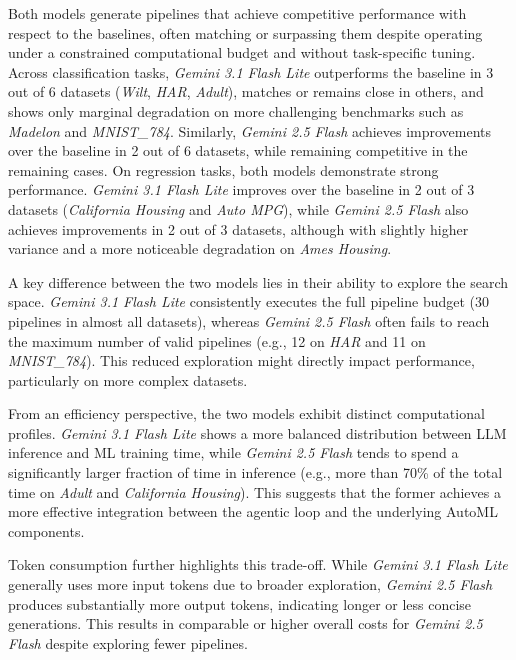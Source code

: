 \documentclass[runningheads]{llncs}
\begin{document}
Both models generate pipelines that achieve competitive performance with respect to the baselines,
often matching or surpassing them despite operating under a constrained computational budget and without task-specific tuning.
%
Across classification tasks,
\textit{Gemini 3.1 Flash Lite} outperforms the baseline in 3 out of 6 datasets (\textit{Wilt}, \textit{HAR}, \textit{Adult}),
matches or remains close in others,
and shows only marginal degradation on more challenging benchmarks such as \textit{Madelon} and \textit{MNIST\_784}.
%
Similarly,
\textit{Gemini 2.5 Flash} achieves improvements over the baseline in 2 out of 6 datasets,
while remaining competitive in the remaining cases.
%
On regression tasks, both models demonstrate strong performance.
\textit{Gemini 3.1 Flash Lite} improves over the baseline in 2 out of 3 datasets (\textit{California Housing} and \textit{Auto MPG}),
while \textit{Gemini 2.5 Flash} also achieves improvements in 2 out of 3 datasets,
although with slightly higher variance and a more noticeable degradation on \textit{Ames Housing}.

A key difference between the two models lies in their ability to explore the search space.
%
\textit{Gemini 3.1 Flash Lite} consistently executes the full pipeline budget
(30 pipelines in almost all datasets),
whereas \textit{Gemini 2.5 Flash} often fails to reach the maximum number of valid pipelines
(e.g., 12 on \textit{HAR} and 11 on \textit{MNIST\_784}).
%
This reduced exploration might directly impact performance,
particularly on more complex datasets.

From an efficiency perspective,
the two models exhibit distinct computational profiles.
%
\textit{Gemini 3.1 Flash Lite} shows a more balanced distribution between \ac{LLM} inference and ML training time,
while \textit{Gemini 2.5 Flash} tends to spend a significantly larger fraction of time in inference
(e.g., more than 70\% of the total time on \textit{Adult} and \textit{California Housing}).
%
This suggests that the former achieves a more effective integration between the agentic loop and the underlying \ac{AutoML} components.
%

Token consumption further highlights this trade-off.
%
While \textit{Gemini 3.1 Flash Lite} generally uses more input tokens due to broader exploration,
\textit{Gemini 2.5 Flash} produces substantially more output tokens, indicating longer or less concise generations.
%
This results in comparable or higher overall costs for \textit{Gemini 2.5 Flash} despite exploring fewer pipelines.
\end{document}
